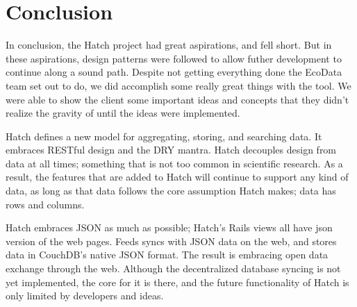 
\section{Conclusion}
In conclusion, the Hatch project had great aspirations, and fell short. But in these
aspirations, design patterns were followed to allow futher development to continue
along a sound path. Despite not getting everything done the EcoData team set out to 
do, we did accomplish some really great things with the tool. We were able to show
the client some important ideas and concepts that they didn't realize the gravity of
until the ideas were implemented.

Hatch defines a new model for aggregating, storing, and searching data. It embraces
RESTful design and the DRY mantra. Hatch decouples design from data at all times;
something that is not too common in scientific research. As a result, the features
that are added to Hatch will continue to support any kind of data, as long as that 
data follows the core assumption Hatch makes; data has rows and columns.

Hatch embraces JSON as much as possible; Hatch's Rails views all have json version of
the web pages. Feeds syncs with JSON data on the web, and stores data in CouchDB's
native JSON format. The result is embracing open data exchange through the web.
Although the decentralized database syncing is not yet implemented, the core for it
is there, and the future functionality of Hatch is only limited by developers and 
ideas.
